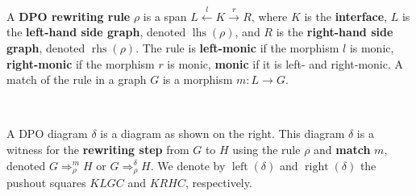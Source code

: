 \begin{definition}
    \label{def:grs:dpo_rule}
  A \textbf{DPO rewriting rule} $\rho$ is a span \( L \overset{l}{\leftarrow} K \overset{r}{\rightarrow} R \), where \( K \) is the \textbf{interface}, \( L \) is the \textbf{left-hand side graph}, denoted \( \operatorname{lhs}(\rho) \), and \( R \) is the \textbf{right-hand side graph}, denoted \( \operatorname{rhs}(\rho) \). The rule is \textbf{left-monic} if the morphism \( l \) is monic, \textbf{right-monic} if the morphism \( r \) is monic, \textbf{monic} if it is left- and right-monic.  
  A match of the rule in a graph \( G \) is a morphism \( m: L \rightarrow G \).   
  \end{definition}
  \begin{definition}
    \label{def:rewriting_step}
      \ \newline
      \noindent
      \begin{minipage}{0.72\textwidth}
        A DPO diagram $\delta$ is a diagram as shown on the right.
        This diagram $\delta$ is a witness for the \textbf{rewriting step} from \( G \) to \( H \) using the rule \( \rho \) and \textbf{match} \( m \), denoted \( G \Rightarrow_\rho^m H \) or \( G \Rightarrow_\rho^\delta H \). We denote by $\operatorname{left}(\delta)$ and $\operatorname{right}(\delta)$ the pushout squares $KLGC$ and $KRHC$, respectively.
      \end{minipage}
      \hfill
      \begin{minipage}{0.27\textwidth}
            \hfill
          \end{minipage}
    \end{definition}

